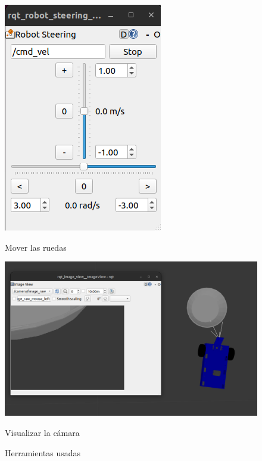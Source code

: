 \begin{figure}[ht!]
	\centering
	\begin{minipage}{0.28\linewidth}
		\centering
		\includegraphics[width=\linewidth]{figs/cap6/steering.png}
		\caption*{\centering Mover las ruedas} 
	\end{minipage}
	\hspace{0.5 cm}
	\begin{minipage}{0.65\linewidth}
		\centering
		\includegraphics[width=\linewidth]{figs/cap6/rqtimage.png}
		\caption*{\centering Visualizar la cámara} 
	\end{minipage}
	\caption{Herramientas usadas}
	\label{fig:hercym}
\end{figure}


